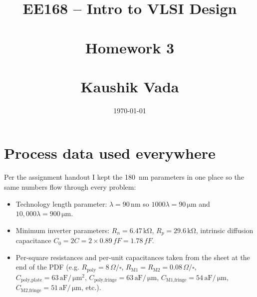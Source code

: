 \documentclass[11pt]{article}
\title{EE168 -- Intro to VLSI Design\\\\Homework 3\\\\Kaushik Vada}
\date{\today}
\newcommand{\um}{\,\si{\micro\meter}}
\newcommand{\ff}{\,\si{fF}}
\newcommand{\kohm}{\,\si{\kilo\ohm}}
\begin{document}
\maketitle
\section*{Process data used everywhere}
Per the assignment handout I kept the 180~nm parameters in one place so the same numbers flow through every problem:
\begin{itemize}[leftmargin=*]
  \item Technology length parameter: $\lambda = 90\,\text{nm}$ so $1000\lambda = 90\um$ and $10{,}000\lambda = 900\um$.
  \item Minimum inverter parameters: $R_n = 6.47\kohm$, $R_p = 29.6\kohm$, intrinsic diffusion capacitance $C_0 = 2C = 2\times 0.89\ff = 1.78\ff$.
  \item Per-square resistances and per-unit capacitances taken from the sheet at the end of the PDF (e.g. $R_{\text{poly}}=8\,\Omega/\square$, $R_{\text{M1}}=R_{\text{M2}}=0.08\,\Omega/\square$, $C_{\text{poly,plate}} = 63\,\text{aF}/\um^2$, $C_{\text{poly,fringe}} = 63\,\text{aF}/\um$, $C_{\text{M1,fringe}} = 54\,\text{aF}/\um$, $C_{\text{M2,fringe}} = 51\,\text{aF}/\um$, etc.).
\end{itemize}
\end{document}
